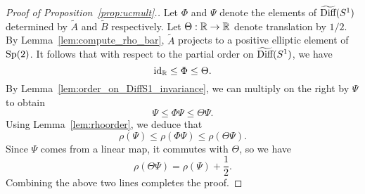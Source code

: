 \begin{proof}[Proof of Proposition~\ref{prop:ucmult}.]
Let $\Phi$ and $\Psi$ denote the elements of $\widetilde{\text{Diff}}(S^1)$ determined by $\widetilde{A}$ and $\widetilde{B}$ respectively.
Let $\Theta:{\mathbb R}\to {\mathbb R}$ denote translation by $1/2$. By Lemma~\ref{lem:compute_rho_bar}, $\widetilde{A}$ projects to a positive elliptic element of $\text{Sp}(2)$. It follows that with respect to the partial order on $\widetilde{\text{Diff}}(S^1)$, we have
\[
\operatorname{id}_{\mathbb R} \le \Phi \le \Theta.
\]
By Lemma~\ref{lem:order_on_DiffS1_invariance}, we can multiply on the right by $\Psi$ to obtain
\[
\Psi \le \Phi\Psi \le \Theta\Psi.
\]
Using Lemma~\ref{lem:rhoorder}, we deduce that
\[
\rho(\Psi) \le \rho(\Phi\Psi) \le \rho(\Theta\Psi).
\]
Since $\Psi$ comes from a linear map, it commutes with $\Theta$, so we have
\[
\rho(\Theta\Psi) = \rho(\Psi) + \frac{1}{2}.
\]
Combining the above two lines completes the proof.
\end{proof}

















